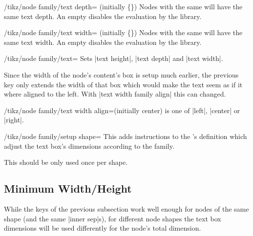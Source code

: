 \begin{key}{/tikz/node family/text depth= (initially \{\})}
Nodes with the same   will have the same text depth.
An empty  disables the evaluation by the library.
\end{key}

\begin{key}{/tikz/node family/text width= (initially \{\})}
Nodes with the same  will have the same text width.
An empty  disables the evaluation by the library.
\end{key}

\begin{key}{/tikz/node family/text=}
Sets |text height|, |text depth| and |text width|.
\end{key}

Since the width of the node's content's box is setup much earlier,
the previous key only extends the width of that box which would make the text
seem as if it where aligned to the left.
With |text width family align| this can changed.
\begin{key}{/tikz/node family/text width align=(initially center)}
 is one of |left|, |center| or |right|.

\begin{codeexample}[preamble=\usetikzlibrary{positioning,ext.node-families},/tikz/node distance=.5cm]
\tikzexternaldisable %
\end{codeexample}
\end{key}

\begin{key}{/tikz/node family/setup shape=}
This adds instructions to the 's definition which
adjust the text box's dimensions according to the family.

This should be only used once per shape.
\end{key}

\subsection{Minimum Width/Height}
While the keys of the previous subsection work well enough for nodes of the same shape
(and the same |inner sep|s), for different node shapes the text box dimensions will be used
differently for the node's total dimension.

